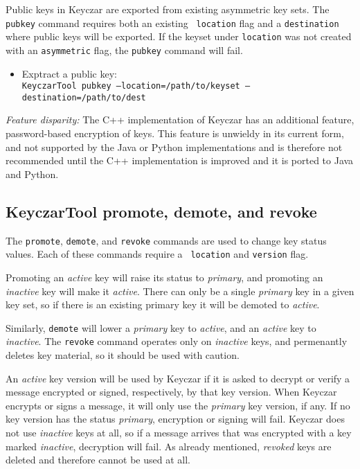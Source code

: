 \documentclass{llncs}
\begin{document}
Public keys in Keyczar are exported from existing asymmetric key
sets. The {\tt pubkey} command requires both an existing {\tt
  location} flag and a {\tt destination} where public keys will be
exported. If the keyset under {\tt location} was not created with an
{\tt asymmetric} flag, the {\tt pubkey} command will fail.

\begin{itemize}
\item Exptract a public key: \\
{\tt KeyczarTool pubkey --location=/path/to/keyset
  --destination=/path/to/dest}
\end{itemize}

\emph{Feature disparity:} The C++ implementation of Keyczar has an
additional feature, password-based encryption of keys.  This feature
is unwieldy in its current form, and not supported by the Java or
Python implementations and is therefore not recommended until the C++
implementation is improved and it is ported to Java and Python.

\subsection{KeyczarTool promote, demote, and revoke}

The {\tt promote}, {\tt demote}, and {\tt revoke} commands are used to
change key status values. Each of these commands require a {\tt
  location} and {\tt version} flag.

Promoting an {\it active} key will raise its status to {\it primary}, and
promoting an {\it inactive} key will make it {\it active}. There
can only be a single {\it primary} key in a given key set, so if there
is an existing primary key it will be demoted to {\it active}.

Similarly, {\tt demote} will lower a {\it primary} key to {\it
  active}, and an {\it active} key to {\it inactive}. The {\tt revoke}
command operates only on {\it inactive} keys, and permenantly deletes
key material, so it should be used with caution.

An {\it active} key version will be used by Keyczar if it is asked to
decrypt or verify a message encrypted or signed, respectively, by that
key version.  When Keyczar encrypts or signs a message, it will only
use the {\it primary} key version, if any.  If no key version has the
status {\it primary}, encryption or signing will fail.  Keyczar does
not use {\it inactive} keys at all, so if a message arrives that was
encrypted with a key marked {\it inactive}, decryption will fail.  As
already mentioned, {\it revoked} keys are deleted and therefore cannot
be used at all.
\end{document}

